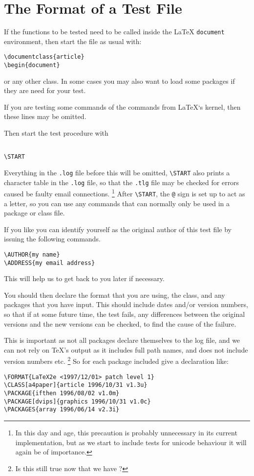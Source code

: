 \documentclass[final]{ltugboat}
\begin{document}
\section{The Format of a Test File}

If the functions to be tested need to be called inside the \LaTeX{}
\texttt{document} environment, then start the file as usual with:
\begin{verbatim}
\documentclass{article}
\begin{document}
\end{verbatim}
or any other class. In some cases you may also want to load some
packages if they are need for your test.

If you are testing some commands of the commands from \LaTeX`s kernel,
then these lines may be omitted.

Then start the test procedure with
\begin{verbatim}

\START
\end{verbatim}
Everything in the \texttt{.log} file before this will be omitted,
\verb|\START| also prints a character table in the \texttt{.log} file,
so that the \texttt{.tlg} file may be checked for errors caused be
faulty email connections.%
\footnote{In this day and age, this precaution is probably unnecessary in
its current implementation, but as we start to include tests for unicode
behaviour it will again be of importance.}
After \verb|\START|, the \texttt{@} sign is
set up to act as a letter, so you can use any commands that can
normally only be used in a package or class file.

If you like you can identify yourself as the original author of this
test file by issuing the following commands.
\begin{verbatim}
\AUTHOR{my name}
\ADDRESS{my email address}
\end{verbatim}
This will help us to get back to you later if necessary.

You should then declare the format that you are using, the class, and
any packages that you have input. This should include dates and/or
version numbers, so that if at some future time, the test fails, any
differences between the original versions and the new versions can be
checked, to find the cause of the failure.

This is important as
not all packages declare themselves to the log file, and we can not
rely on \TeX's output as it includes full path names, and does not
include version numbers etc.%
\footnote{Is this still true now that we have \texttt{\string\listfiles}?}
So for each package included give a
declaration like:
\begin{verbatim}
\FORMAT{LaTeX2e <1997/12/01> patch level 1}
\CLASS[a4paper]{article 1996/10/31 v1.3u}
\PACKAGE{ifthen 1996/08/02 v1.0m}
\PACKAGE[dvips]{graphics 1996/10/31 v1.0c}
\PACKAGES{array 1996/06/14 v2.3i}
\end{verbatim}
\end{document}

